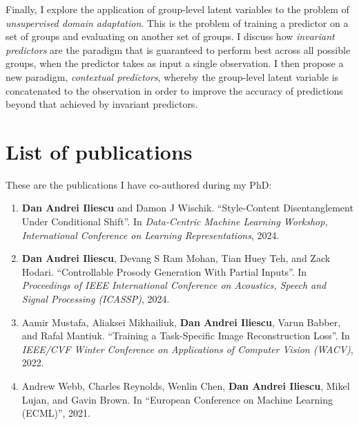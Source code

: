 \documentclass[../thesis.tex]{subfiles}
\begin{document}
Finally, I explore the application of group-level latent variables to the problem of \textit{unsupervised domain adaptation}. This is the problem of training a predictor on a set of groups and evaluating on another set of groups. I discuss how \textit{invariant predictors} are the paradigm that is guaranteed to perform best across all possible groups, when the predictor takes as input a single observation. I then propose a new paradigm, \textit{contextual predictors}, whereby the group-level latent variable is concatenated to the observation in order to improve the accuracy of predictions beyond that achieved by invariant predictors.


\section{List of publications}

These are the publications I have co-authored during my PhD:

\begin{enumerate}
    \item \textbf{Dan Andrei Iliescu} and Damon J Wischik. ``Style-Content Disentanglement Under Conditional Shift''. In \textit{Data-Centric Machine Learning Workshop, International Conference on Learning Representations}, 2024.
    \item \textbf{Dan Andrei Iliescu}, Devang S Ram Mohan, Tian Huey Teh, and Zack Hodari. ``Controllable Prosody Generation With Partial Inputs''. In \textit{Proceedings of IEEE International Conference
    on Acoustics, Speech and Signal Processing (ICASSP)}, 2024.
    \item Aamir Mustafa, Aliaksei Mikhailiuk, \textbf{Dan Andrei Iliescu}, Varun Babber, and Rafal Mantiuk. ``Training a Task-Specific Image Reconstruction Loss''. In \textit{IEEE/CVF Winter Conference on Applications of Computer Vision (WACV)}, 2022.
    \item Andrew Webb, Charles Reynolds, Wenlin Chen, \textbf{Dan Andrei Iliescu}, Mikel Lujan, and Gavin Brown. In ``European Conference on Machine Learning (ECML)'', 2021.
\end{enumerate}
\end{document}
